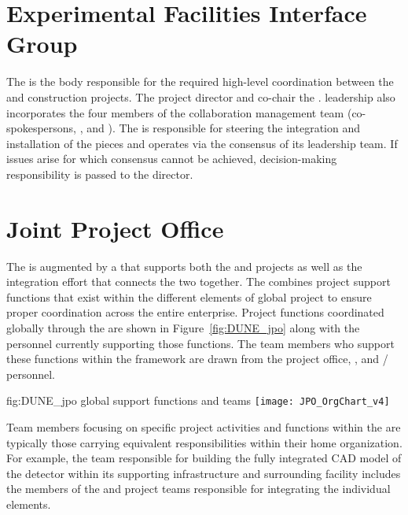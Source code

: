 \section{Experimental Facilities Interface Group}
\label{sec:efig}

The  is the body responsible for the required high-level
coordination between the  and  construction 
projects.  The  project director and  
co-chair the .   leadership also incorporates 
the four members of the  collaboration management 
team (co-spokespersons, , and ).  
The  is responsible for steering the integration and   
installation of the  pieces and operates via the 
consensus of its leadership team.  If issues arise for which consensus 
cannot be achieved, decision-making responsibility is passed to the 
 director.

\section{Joint Project Office}
\label{sec:jpo}

The  is augmented by a  that supports both 
the  and  projects as well as the integration
effort that connects the two together. The  combines
project support functions that exist within the different elements 
of global project to ensure proper coordination across the entire 
 enterprise.  Project functions coordinated globally 
through the  are shown in Figure~\ref{fig:DUNE_jpo} along 
with the personnel currently supporting those functions.  The team 
members who support these functions within the  framework
are drawn from the  project office,  , 
and /  personnel.  
\begin{dunefigure}{fig:DUNE_jpo}
  { global support functions and teams}
  \texttt{[image: JPO\_OrgChart\_v4]}
\end{dunefigure}
Team members focusing on specific project activities and functions 
within the  are typically those carrying equivalent 
responsibilities within their home organization.  For example, 
the  team responsible for building the fully integrated 
\threed CAD model of the detector within its supporting infrastructure 
and surrounding facility includes the members of the  and 
 project teams responsible for integrating the individual 
elements.

